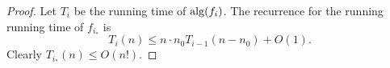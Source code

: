\begin{proof}
    Let $T_i$ be the running time of $\operatorname{\text{\textup{alg}}}(f_i)$.
  The recurrence for the running running time of $f_{i_*}$ is 
  $$T_i(n) \le n \cdot n_0T_{i-1}(n-n_0)+O(1).$$
  Clearly $T_{i_*}(n) \le O(n!)$.

\end{proof}

